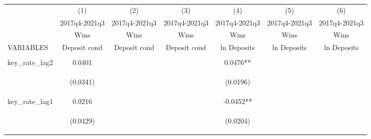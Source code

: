 \documentclass[]{article}
\begin{document}
\begin{center}
\begin{tabular}{lcccccc} \hline
 & (1) & (2) & (3) & (4) & (5) & (6) \\
 & 2017q4-2021q3 & 2017q4-2021q3 & 2017q4-2021q3 & 2017q4-2021q3 & 2017q4-2021q3 & 2017q4-2021q3 \\
 & Wins & Wins & Wins & Wins & Wins & Wins \\
VARIABLES & Deposit cond & Deposit cond & Deposit cond & ln Deposits & ln Deposits & ln Deposits \\ \hline
\vspace{4pt} & \begin{footnotesize}\end{footnotesize} & \begin{footnotesize}\end{footnotesize} & \begin{footnotesize}\end{footnotesize} & \begin{footnotesize}\end{footnotesize} & \begin{footnotesize}\end{footnotesize} & \begin{footnotesize}\end{footnotesize} \\
key\_rate\_lag2 & 0.0401 &  &  & 0.0476** &  &  \\
\vspace{4pt} & \begin{footnotesize}(0.0341)\end{footnotesize} & \begin{footnotesize}\end{footnotesize} & \begin{footnotesize}\end{footnotesize} & \begin{footnotesize}(0.0196)\end{footnotesize} & \begin{footnotesize}\end{footnotesize} & \begin{footnotesize}\end{footnotesize} \\
key\_rate\_lag1 & 0.0216 &  &  & -0.0452** &  &  \\
\vspace{4pt} & \begin{footnotesize}(0.0429)\end{footnotesize} & \begin{footnotesize}\end{footnotesize} & \begin{footnotesize}\end{footnotesize} & \begin{footnotesize}(0.0204)\end{footnotesize} & \begin{footnotesize}\end{footnotesize} & \begin{footnotesize}\end{footnotesize} \\

\end{tabular}
\end{center}
\end{document}
